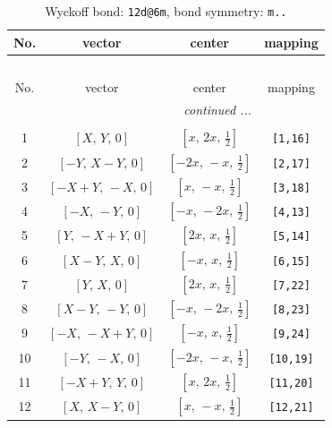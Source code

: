\documentclass[fleqn,8pt]{jsarticle}
\begin{document}
\begin{longtable}{cccc}
\caption{Wyckoff bond: {\tt 12d@6m}, bond symmetry: {\tt m..}}
 \\
 \hline \hline
No. & vector & center & mapping \\ \hline \endfirsthead

\multicolumn{3}{l}{\tablename\ \thetable{}} \\
 \hline \hline
No. & vector & center & mapping \\ \hline \endhead

 \hline \hline
\multicolumn{3}{r}{\footnotesize\it continued ...} \\ \endfoot

 \hline \hline
\multicolumn{3}{r}{} \\ \endlastfoot

1 & $\left[ X,\, Y,\, 0 \right]$ & $\left[ x,\, 2 x,\, \frac{1}{2} \right]$ & {\tt [1,16]} \\ \hline
2 & $\left[ - Y,\, X - Y,\, 0 \right]$ & $\left[ - 2 x,\, - x,\, \frac{1}{2} \right]$ & {\tt [2,17]} \\ \hline
3 & $\left[ - X + Y,\, - X,\, 0 \right]$ & $\left[ x,\, - x,\, \frac{1}{2} \right]$ & {\tt [3,18]} \\ \hline
4 & $\left[ - X,\, - Y,\, 0 \right]$ & $\left[ - x,\, - 2 x,\, \frac{1}{2} \right]$ & {\tt [4,13]} \\ \hline
5 & $\left[ Y,\, - X + Y,\, 0 \right]$ & $\left[ 2 x,\, x,\, \frac{1}{2} \right]$ & {\tt [5,14]} \\ \hline
6 & $\left[ X - Y,\, X,\, 0 \right]$ & $\left[ - x,\, x,\, \frac{1}{2} \right]$ & {\tt [6,15]} \\ \hline
7 & $\left[ Y,\, X,\, 0 \right]$ & $\left[ 2 x,\, x,\, \frac{1}{2} \right]$ & {\tt [7,22]} \\ \hline
8 & $\left[ X - Y,\, - Y,\, 0 \right]$ & $\left[ - x,\, - 2 x,\, \frac{1}{2} \right]$ & {\tt [8,23]} \\ \hline
9 & $\left[ - X,\, - X + Y,\, 0 \right]$ & $\left[ - x,\, x,\, \frac{1}{2} \right]$ & {\tt [9,24]} \\ \hline
10 & $\left[ - Y,\, - X,\, 0 \right]$ & $\left[ - 2 x,\, - x,\, \frac{1}{2} \right]$ & {\tt [10,19]} \\ \hline
11 & $\left[ - X + Y,\, Y,\, 0 \right]$ & $\left[ x,\, 2 x,\, \frac{1}{2} \right]$ & {\tt [11,20]} \\ \hline
12 & $\left[ X,\, X - Y,\, 0 \right]$ & $\left[ x,\, - x,\, \frac{1}{2} \right]$ & {\tt [12,21]} \\
\end{longtable}
\end{document}
